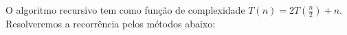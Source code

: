 O algoritmo recursivo tem como função de complexidade $T(n) = 2T(\frac{n}{2}) + n$. Resolveremos a recorrência pelos métodos abaixo:




